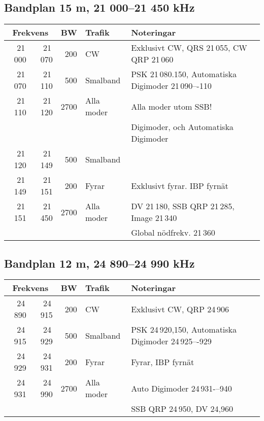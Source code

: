 {\subsection{Bandplan 15 m, 21 000--21 450 kHz}
\begin{tabular}{rrrll}
\multicolumn{2}{c}{\textbf{Frekvens}} & \textbf{BW} & \textbf{Trafik} & \textbf{Noteringar} \\ \hline

21\,000 & 21\,070 & 200  & CW         & Exklusivt CW, QRS 21\,055, CW QRP 21\,060           \\ \hline
21\,070 & 21\,110 & 500  & Smalband   & PSK 21\,080.150, Automatiska Digimoder 21\,090–-110 \\
21\,110 & 21\,120 & 2700 & Alla moder & Alla moder utom SSB!                                \\
        &         &      &            & Digimoder, och Automatiska Digimoder                \\ \hline
21\,120 & 21\,149 & 500  & Smalband   &                                                     \\ \hline
21\,149 & 21\,151 & 200  & Fyrar      & Exklusivt fyrar. IBP fyrnät                         \\ \hline
21\,151 & 21\,450 & 2700 & Alla moder & DV 21\,180, SSB QRP 21\,285, Image 21\,340          \\
        &         &      &            & Global nödfrekv. 21\,360                            \\ \hline
\end{tabular}

\subsection{Bandplan 12 m, 24 890--24 990 kHz}
\begin{tabular}{rrrll}
\multicolumn{2}{c}{\textbf{Frekvens}} & \textbf{BW} & \textbf{Trafik} & \textbf{Noteringar} \\ \hline
24\,890 & 24\,915 & 200  & CW         & Exklusivt CW, QRP 24\,906                             \\ \hline
24\,915 & 24\,929 & 500  & Smalband   & PSK 24\,920,150, Automatiska Digimoder 24\,925–-929 \\ \hline
24\,929 & 24\,931 & 200  & Fyrar      & Fyrar, IBP fyrnät                                    \\ \hline
24\,931 & 24\,990 & 2700 & Alla moder & Auto Digimoder 24\,931-–940                        \\
       &        &      &            & SSB QRP 24\,950, DV 24,960                            \\ \hline
\end{tabular}

}
